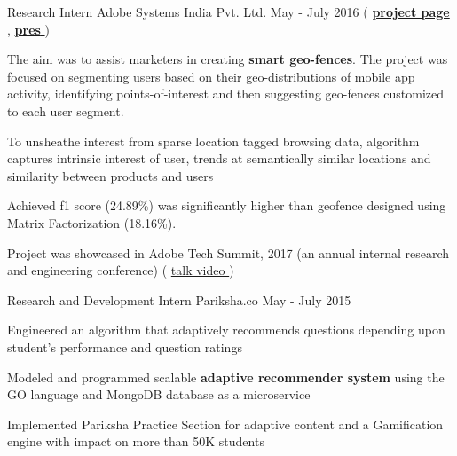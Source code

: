 \begin{cventries}
  \cventry
    {Research Intern} %
    {Adobe Systems India Pvt. Ltd.} %
    {May - July 2016} %
    {
    	(
	    	\textbf{\href{https://research.adobe.com/project/smart-geo-fencing/}{project page} \ExternalLink},
	    	\href{https://drive.google.com/file/d/1nfCv13-7V3BElFPLBfFI\_LF0RRcsdNvy/view?usp=sharing}{\textbf{pres \ExternalLink}}
	    )
    }  %
    {
      \begin{cvitems} %
        \item {
			The aim was to assist marketers in creating \textbf{smart geo-fences}. The project was focused on segmenting users based on their geo-distributions of mobile app activity, identifying points-of-interest and then suggesting geo-fences customized to each user segment.
        }
        \item { 
        	To unsheathe interest from sparse location tagged browsing data, algorithm captures intrinsic interest of user, trends at semantically similar locations and similarity between products and users
        }
        \item {
        	Achieved f1 score (24.89\%) was significantly higher than geofence designed using Matrix Factorization (18.16\%). 
        }
        \item {
        	 Project was showcased in Adobe Tech Summit, 2017 (an annual internal research and engineering conference) ( \href{https://www.youtube.com/watch?v=PS0imh951ZE}{talk video \ExternalLink}) 
        }
      \end{cvitems}
    }

  \cventry
    {Research and Development Intern} %
    {Pariksha.co} %
    {May - July 2015} %
    {} %
    {
      \begin{cvitems} 
      	\item {Engineered an algorithm that adaptively recommends questions depending upon student’s performance and question ratings}
      	\item {Modeled and programmed scalable \textbf{adaptive recommender system} using the GO language and MongoDB database as a microservice}
      	\item {Implemented Pariksha Practice Section for adaptive content and a Gamification engine with impact on more than 50K students}
      \end{cvitems}
    }
\end{cventries}



